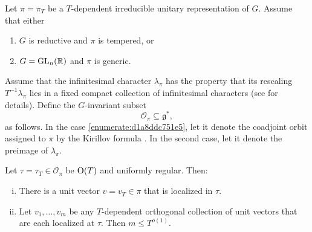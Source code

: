 \documentclass[reqno]{amsart} 
\numberwithin{equation}{section}
\numberwithin{theorem}{section}
\begin{document}
\begin{theorem}\label{theorem:d1a8ddcbd754}
  Let $\pi = \pi_T$ be a $T$-dependent irreducible unitary representation of $G$.  Assume that either
  \begin{enumerate}
  \item\label{enumerate:d1a8ddc751e5} $G$ is reductive and $\pi$ is tempered, or
  \item\label{enumerate:d1a8ddcc2f30} $G = \operatorname{GL}_n(\mathbb{R})$ and $\pi$ is generic.
  \end{enumerate}
  Assume that the infinitesimal character $\lambda_\pi$  has the property that its rescaling $T^{-1} \lambda_\pi$ lies in a fixed compact collection of infinitesimal characters (see \cite[\S9]{nelson-venkatesh-1} for details).  Define the $G$-invariant subset
  \begin{equation*}
\mathcal{O}_\pi \subseteq \mathfrak{g}^*,
\end{equation*}
as follows.  In the case \eqref{enumerate:d1a8ddc751e5}, let it denote the coadjoint orbit assigned to $\pi$ by the Kirillov formula \cite[\S6]{nelson-venkatesh-1}.  In the second case, let it denote the preimage of $\lambda_\pi$.

Let $\tau = \tau_T \in \mathcal{O}_\pi$ be $\operatorname{O}(T)$ and uniformly regular.  Then:
  \begin{enumerate}[(i)]
  \item There is a unit vector $v = v_T \in \pi$ that is localized in $\tau$.
  \item Let $v_1,\dotsc,v_m$ be any $T$-dependent orthogonal collection of unit vectors that are each localized at $\tau$.  Then $m \leq T^{o(1)}$.
  \end{enumerate}
\end{theorem}
\end{document}
